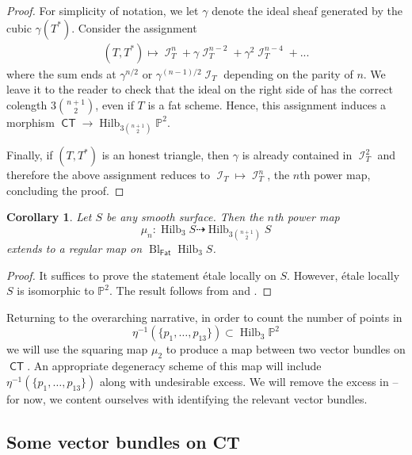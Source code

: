 \documentclass[reqno, 11pt]{amsart}
\theoremstyle{plain}
\newtheorem{corollary}[theorem]{Corollary}
\theoremstyle{remark}
\renewcommand{\P}{\mathbb{P}}
\DeclareMathOperator{\Hilb}{Hilb}
\DeclareMathOperator{\I}{\mathcal{I}}
\DeclareMathOperator{\CT}{\mathsf{CT}}
\newcommand{\from}{\colon}
\DeclareMathOperator{\Fat}{\mathsf{Fat}}
\DeclareMathOperator{\Bl}{Bl}
\begin{document}
\begin{proof} For simplicity of notation, we let $\gamma$ denote the
  ideal sheaf generated by the cubic $\gamma(T^{*})$. Consider the
  assignment
  \begin{eqnarray}
    \label{eqn:modifiedideal}
  (T, T^{*}) \mapsto \I_{T}^{n} + \gamma \I_{T}^{n-2} + \gamma^{2}\I_{T}^{n-4} + ...
\end{eqnarray}
where the sum ends at $\gamma^{n/2}$ or $\gamma^{(n-1)/2}\I_{T}$
depending on the parity of $n$. We leave it to the reader to check
that the ideal on the right side of  has
the correct colength $3{n+1 \choose 2}$, even if $T$ is a fat
scheme. Hence, this assignment induces a morphism
$\CT \to \Hilb_{3 {n+1 \choose 2}}\P^{2}$.

Finally, if $(T, T^{*})$ is an honest triangle, then
$\gamma$ is already contained in $\I_{T}^{2}$ and therefore the
above assignment reduces to $\I_{T} \mapsto \I_{T}^{n}$,
 the $n$th power map, concluding the proof.
\end{proof}

\begin{corollary}
  \label{cor:AnySurface}
  Let $S$ be any smooth surface. Then the $n$th power map
  \[\mu_{n} \from \Hilb_{3}S \dashrightarrow \Hilb_{3 {n+1 \choose
      2}}S\] extends to  a regular map on $\Bl_{\Fat}\Hilb_{3}S$.
\end{corollary} 
\begin{proof}
  It suffices to prove the statement  \'etale locally on $S$.
  However, \'etale locally $S$ is isomorphic to $\P^{2}$.  The result
  follows from  and
  .
\end{proof}


Returning to the overarching narrative, in order to count the number of points in $$\eta^{-1}(\{p_{1}, \dots, p_{13}\}) \subset \Hilb_{3}\P^{2}$$ we will use the squaring map $\mu_{2}$ to
produce a map between two vector bundles on $\CT$.  An
appropriate degeneracy scheme of this map will include
$\eta^{-1}(\{p_{1}, \dots, p_{13}\})$ along with undesirable excess. We will remove the excess in  -- for now, we content ourselves with identifying the relevant vector bundles.



\subsection{Some vector bundles on CT}
\label{sec:vectorbundle}
\end{document}
